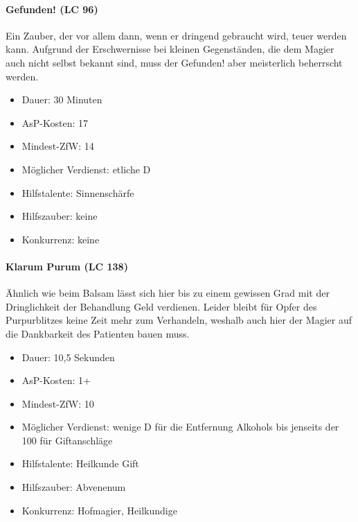 \paragraph{Gefunden! (LC 96)}
Ein Zauber, der vor allem dann, wenn er dringend gebraucht wird, teuer werden kann. Aufgrund der Erschwernisse bei kleinen Gegenständen, die dem Magier auch nicht selbst bekannt sind, muss der Gefunden! aber meisterlich beherrscht werden.
\begin{itemize}
	\item Dauer: 30 Minuten
	\item AsP-Kosten: 17
	\item Mindest-ZfW: 14
	\item Möglicher Verdienst: etliche D
	\item Hilfstalente: Sinnenschärfe
	\item Hilfszauber: keine
	\item Konkurrenz: keine
\end{itemize}

\paragraph{Klarum Purum (LC 138)}
Ähnlich wie beim Balsam lässt sich hier bis zu einem gewissen Grad mit der Dringlichkeit der Behandlung Geld verdienen. Leider bleibt für Opfer des Purpurblitzes keine Zeit mehr zum Verhandeln, weshalb auch hier der Magier auf die Dankbarkeit des Patienten bauen muss.
\begin{itemize}
	\item Dauer: 10,5 Sekunden
	\item AsP-Kosten: 1+
	\item Mindest-ZfW: 10
	\item Möglicher Verdienst: wenige D für die Entfernung Alkohols bis jenseits der \SI{100}{\D} für Giftanschläge
	\item Hilfstalente: Heilkunde Gift
	\item Hilfszauber: Abvenenum
	\item Konkurrenz: Hofmagier, Heilkundige
\end{itemize}

